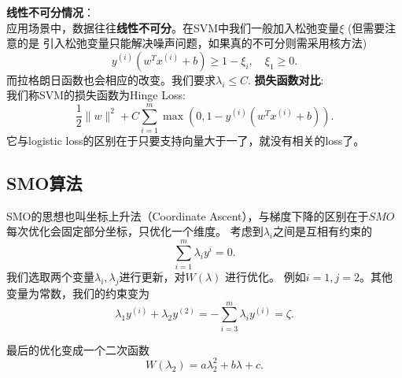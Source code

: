 \noindent \textbf{线性不可分情况}：\\
应用场景中，数据往往\textbf{线性不可分}。在SVM中我们一般加入松弛变量$\xi$ (但需要注意的是
引入松弛变量只能解决噪声问题，如果真的不可分则需采用核方法)
\[
		y^{(i)}\left( w^{T}x^{(i)} + b \right) \ge 1 - \xi_{i}, \quad \xi_{1} \ge  0
.\] 
而拉格朗日函数也会相应的改变。我们要求$\lambda_{i} \le  C$.
\noindent \textbf{损失函数对比}:\\
我们称SVM的损失函数为Hinge Loss:
\[
		\frac{1}{2} \|w\|^2 + C \sum_{i=1}^{m} \max\left( 0, 1- y^{(i)}\left( w^{T}x^{(i)}+b \right)  \right) 
.\] 
它与logistic loss的区别在于只要支持向量大于一了，就没有相关的loss了。
\subsection{SMO算法}
SMO的思想也叫坐标上升法（Coordinate Ascent），与梯度下降的区别在于$SMO$每次优化会固定部分坐标，只优化一个维度。
考虑到$\lambda_i$之间是互相有约束的
\[
\sum_{i=1}^{m} \lambda_{i} y^{i} = 0
.\] 
我们选取两个变量$\lambda_i, \lambda_j$进行更新，对$W\left( \lambda \right) $ 进行优化。
例如$i=1,j=2$。其他变量为常数，我们的约束变为
\[
\lambda_1 y^{(i)} + \lambda_2 y^{(2)} =-\sum_{i=3}^{m} \lambda_{i}y^{(i)} = \zeta  
.\] 

最后的优化变成一个二次函数
 \[
		 W\left( \lambda_2 \right)  = a \lambda_2^2 + b \lambda + c  
.\] 
